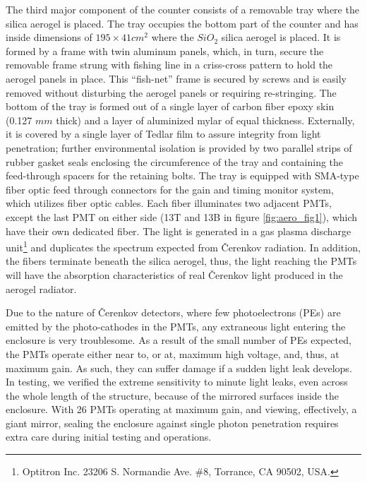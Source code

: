 The third major component of the counter consists of a removable tray where the
silica aerogel is placed. 
The tray occupies the bottom part of the counter and has inside dimensions of 
$195\times 41 cm^2$ where the $SiO_2$ silica aerogel is placed. 
It is formed by a frame with twin aluminum panels, which, in turn, secure 
the removable frame strung with fishing line in a criss-cross pattern to hold 
the aerogel panels in place.  This ``fish-net'' frame is secured by
screws and is easily removed without disturbing the aerogel panels or requiring
re-stringing.  The bottom of the tray is formed out of a single layer of carbon
fiber epoxy skin (0.127 $mm$ thick) and a layer of aluminized mylar of equal
thickness.  Externally, it is covered by a single layer of Tedlar film to
assure integrity from light penetration; further environmental isolation is
provided by two parallel strips of rubber gasket seals enclosing the
circumference of the tray and containing the feed-through spacers for the
retaining bolts.   The tray is equipped with SMA-type fiber optic feed through
connectors for the gain and timing monitor system, which utilizes fiber
optic cables.  Each fiber illuminates two adjacent PMTs, except the last PMT
on either side (13T and 13B in figure \ref{fig:aero_fig1}), 
which have their own dedicated fiber. 
The light is generated in a gas plasma discharge 
unit\footnote{Optitron Inc. 23206 S. Normandie Ave. \#8, Torrance, CA 90502, USA.} 
and duplicates the spectrum expected from \v{C}erenkov radiation.  In addition, the
fibers terminate beneath the silica aerogel, thus, the light reaching the PMTs
will have the absorption characteristics of real \v{C}erenkov light produced 
in the aerogel radiator. 

Due to the nature of \v{C}erenkov detectors, where few photoelectrons (PEs) are
emitted by the photo-cathodes in the PMTs, any extraneous light entering the
enclosure is very troublesome.  As a result of the small number of PEs
expected, the PMTs operate either near to, or at, maximum high voltage, and,
thus, at maximum gain.  
As such, they can suffer damage if a sudden light leak develops.  
In testing, we verified the extreme sensitivity to minute light leaks, 
even across the whole length of the structure, because of the mirrored
surfaces inside the enclosure.  
With 26 PMTs operating at maximum gain, and viewing, effectively, a giant mirror, 
sealing the enclosure against single photon penetration requires extra care during 
initial testing and operations.

